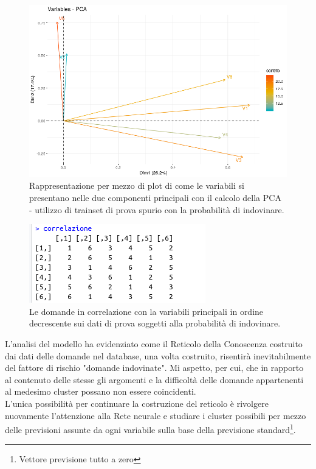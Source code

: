 \begin{figure}[H]
\centering
	\includegraphics[width=0.80\linewidth]{../../PCA/plot/PCA-valorindovinati.png}
	\caption{Rappresentazione per mezzo di plot di come le variabili si presentano nelle due componenti principali con il calcolo della PCA - utilizzo di trainset di prova spurio con la probabilità di indovinare.}
	\label{Rappresentazione per mezzo di plot di come le variabili si presentano nelle due componenti principali con il calcolo della PCA - utilizzo di trainset di prova spurio con la probabilita di indovinare.}
\end{figure}


\begin{figure}[H]
\centering
	\includegraphics[width=0.60\linewidth]{../../PCA/plot/correlazione_with-probability.png}
	\caption{Le domande in correlazione con la variabili principali in ordine decrescente sui dati di prova soggetti alla probabilità di indovinare.}
	\label{Le domande in correlazione con la variabili principali in ordine decrescente sui dati di prova soggetti alla probabilita di indovinare.}
\end{figure}

\noindent L'analisi del modello ha evidenziato come il Reticolo della Conoscenza costruito  dai dati delle domande nel database, una volta costruito, risentir\`a inevitabilmente del fattore di rischio "domande indovinate". Mi aspetto, per cui, che in rapporto al contenuto delle stesse gli argomenti e la difficolt\`a  delle domande appartenenti al medesimo cluster possano non essere coincidenti.\\
L'unica possibilit\`a per continuare la costruzione del reticolo \`e rivolgere nuovamente l'attenzione alla Rete neurale e studiare i cluster possibili per mezzo delle previsioni assunte da ogni variabile sulla base della previsione standard\footnote{Vettore previsione tutto a zero}.
